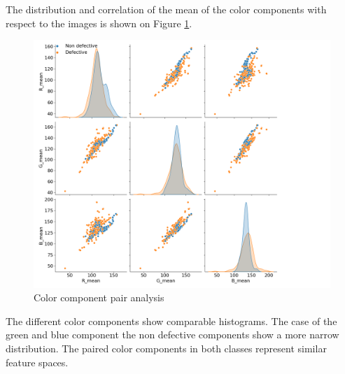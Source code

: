 \documentclass[10pt, final]{article}
\begin{document}
			The distribution and correlation of the mean of the color components with respect to the images is shown on 
			Figure \ref{fig:comp_pair}.
			\begin{figure}[!ht]
				\centering
				\includegraphics[width=\textwidth]{./tex_graphs/comp_pair.png}
				\caption{Color component pair analysis}
				\label{fig:comp_pair}
			\end{figure}
			The different color components show comparable histograms.
			The case of the green and blue component the non defective components show a more narrow distribution.
			The paired color components in both classes represent similar feature spaces.
\end{document}
